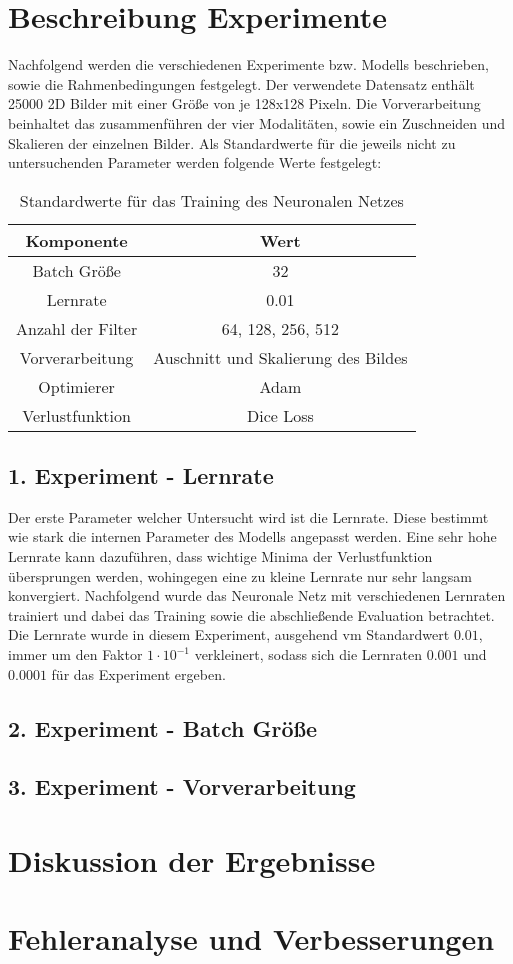 \section{Beschreibung Experimente}
Nachfolgend werden die verschiedenen Experimente bzw. \glspl{Modell} beschrieben, sowie die Rahmenbedingungen festgelegt. Der verwendete Datensatz enthält 25000 2D Bilder mit einer Größe von je 128x128 Pixeln. Die Vorverarbeitung beinhaltet das zusammenführen der vier Modalitäten, sowie ein Zuschneiden und Skalieren der einzelnen Bilder. Als Standardwerte für die jeweils nicht zu untersuchenden Parameter werden folgende Werte festgelegt:
\begin{table}[h!]
\begin{longtable}{|c|c|}
	\hline
		\multicolumn{1}{|c|}{\textbf{Komponente}} & \multicolumn{1}{c|}{\textbf{Wert}} \\
		\endhead
	\hline
		Batch Größe & 32 \\
	\hline
		Lernrate & 0.01 \\
	\hline
		Anzahl der Filter & 64, 128, 256, 512 \\
	\hline
		Vorverarbeitung & Auschnitt und Skalierung des Bildes \\
	\hline
		Optimierer & Adam \\
	\hline
		Verlustfunktion & Dice Loss \\
	\hline
\end{longtable}
\caption{Standardwerte für das Training des Neuronalen Netzes}
\end{table}

\subsection{1. Experiment - Lernrate}
Der erste Parameter welcher Untersucht wird ist die Lernrate. Diese bestimmt wie stark die internen Parameter des \gls{Modell}s angepasst werden. Eine sehr hohe Lernrate kann dazuführen, dass wichtige Minima der Verlustfunktion übersprungen werden, wohingegen eine zu kleine Lernrate nur sehr langsam konvergiert. Nachfolgend wurde das Neuronale Netz mit verschiedenen Lernraten trainiert und dabei das Training sowie die abschließende Evaluation betrachtet. Die Lernrate wurde in diesem Experiment, ausgehend vm Standardwert $0.01$, immer um den Faktor $1\cdot 10^{-1}$ verkleinert, sodass sich die Lernraten $0.001$ und $0.0001$ für das Experiment ergeben.






\subsection{2. Experiment - Batch Größe}
\subsection{3. Experiment - Vorverarbeitung}



\section{Diskussion der Ergebnisse}
\section{Fehleranalyse und Verbesserungen}
